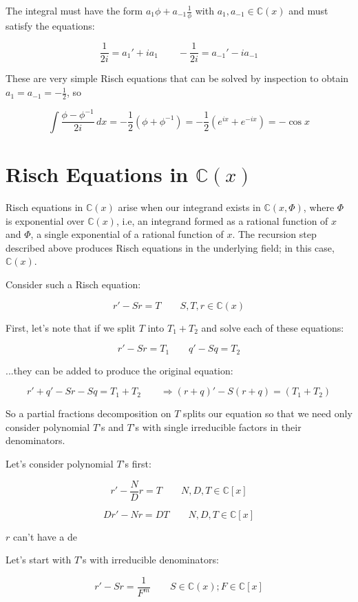 The integral must have the form $a_1 \phi + a_{-1} \frac{1}{\phi}$
with $a_1, a_{-1} \in {\mathbb C}(x)$ and must satisfy the equations:

$$\frac{1}{2i} = a_1' + i a_1 \qquad - \frac{1}{2i} = a_{-1}' - i a_{-1}$$ 

These are very simple Risch equations that can be solved by inspection
to obtain $a_1 = a_{-1} = -\frac{1}{2}$, so

$$\int \frac{\phi - \phi^{-1}}{2i} \,dx = -\frac{1}{2}(\phi + \phi^{-1})
 = -\frac{1}{2}(e^{ix} + e^{-ix}) = -\cos x$$

\endexample

\vfill\eject
\section{Risch Equations in ${\mathbb C}(x)$}

Risch equations in ${\mathbb C}(x)$ arise when our integrand exists in
${\mathbb C}(x,\Phi)$, where $\Phi$ is exponential over ${\mathbb
C}(x)$, i.e, an integrand formed as a rational function of $x$ and $\Phi$, a
single exponential of a rational function of $x$.  The recursion step
described above produces Risch equations in the underlying field;
in this case, ${\mathbb C}(x)$.

Consider such a Risch equation:

$$r' - S r = T \qquad S,T,r \in {\mathbb C}(x)$$

First, let's note that if we split $T$ into $T_1 + T_2$ and solve
each of these equations:

$$r' - S r = T_1 \qquad q' - S q = T_2$$

...they can be added to produce the original equation:

$$r' + q' - S r - S q = T_1 + T_2 \qquad \Longrightarrow (r+q)' - S (r+q) = (T_1 + T_2)$$

So a partial fractions decomposition on $T$ splits our equation
so that we need only consider polynomial $T$'s and $T$'s with
single irreducible factors in their denominators.

Let's consider polynomial $T$'s first:

$$r' - \frac{N}{D} r = T \qquad N,D,T \in {\mathbb C}[x]$$

$$D r' - N r = D T \qquad N,D,T \in {\mathbb C}[x]$$

$r$ can't have a de


Let's start with $T$'s with irreducible denominators:

$$r' - S r = \frac{1}{F^m} \qquad S \in {\mathbb C}(x); F \in {\mathbb C}[x]$$


